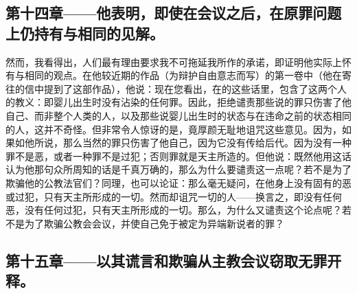
\subsection{第十四章——他表明，即使在会议之后，在原罪问题上仍持有与相同的见解。}

然而，我看得出，人们最有理由要求我不可拖延我所作的承诺，即证明他实际上怀有与相同的观点。在他较近期的作品（为辩护自由意志而写）的第一卷中（他在寄往的信中提到了这部作品），他说：现在您看出，在的这些话里，包含了这两个人的教义：即婴儿出生时没有沾染的任何罪。因此，拒绝谴责那些说的罪只伤害了他自己、而非整个人类的人，以及那些说婴儿出生时的状态与在违命之前的状态相同的人，这并不奇怪。但非常令人惊讶的是，竟厚颜无耻地诅咒这些意见。因为，如果如他所说，那么当然的罪只伤害了他自己，因为它没有传给后代。因为没有一种罪不是恶，或者一种罪不是过犯；否则罪就是天主所造的。但他说：既然他用这话认为他那句众所周知的话是千真万确的，那么为什么要谴责这一点呢？若不是为了欺骗他的公教法官们？同理，也可以论证：那么毫无疑问，在他身上没有固有的恶或过犯，只有天主所形成的一切。然而却诅咒一切的人——换言之，即没有任何恶，没有任何过犯，只有天主所形成的一切。那么，为什么又谴责这个论点呢？若不是为了欺骗公教会会议，并使自己免于被定为异端新说者的罪？\par


\subsection{第十五章——以其谎言和欺骗从主教会议窃取无罪开释。}

